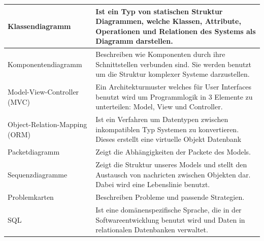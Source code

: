 \documentclass[enabledeprecatedfontcommands,fontsize=12pt,paper=a4,twoside]{scrartcl}
\begin{document}
\begin{longtable}[c]{|p{7cm}|p{8cm}|}
Klassendiagramm                        & Ist ein Typ von statischen Struktur Diagrammen, welche Klassen, Attribute, Operationen und Relationen des Systems als Diagramm darstellen.                                                                              \\ \hline
Komponentendiagramm                    & Beschreiben wie Komponenten durch ihre Schnittstellen verbunden sind. Sie werden benutzt um die Struktur komplexer Systeme darzustellen.                                                                                \\ \hline
Model-View-Controller (MVC)            & Ein Architekturmuster welches für User Interfaces benutzt wird um Programmlogik in 3 Elemente zu unterteilen: Model, View und Controller.                                                                               \\ \hline
Object-Relation-Mapping (ORM)          & Ist ein Verfahren um Datentypen zwischen inkompatiblen Typ Systemen zu konvertieren. Dieses erstellt eine virtuelle Objekt Datenbank                                                                                                                                                                                                             \\ \hline
Packetdiagramm                         & Zeigt die Abhängigkeiten der Packete des Models.                                                                                                                                                                        \\ \hline
Sequenzdiagramme                       & Zeigt die Struktur unseres Models und stellt den Austausch von nachricten zwischen Objekten dar. Dabei wird eine Lebenslinie benutzt.                                                                                   \\ \hline
Problemkarten                          & Beschreiben Probleme und passende Strategien.                                                                                                                                                                           \\ \hline
SQL                                    & Ist eine domänenspezifische Sprache, die in der Softwareentwicklung benutzt wird und Daten in relationalen Datenbanken verwaltet.                                                                                         \\ \hline
\end{longtable}
\end{document}
